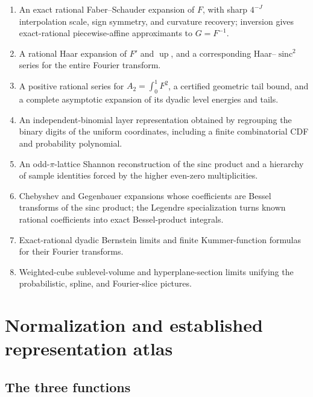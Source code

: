 \documentclass[11pt,oneside]{article}
\theoremstyle{definition}
\theoremstyle{remark}
\newcommand{\Up}{\operatorname{up}}
\newcommand{\sinc}{\operatorname{sinc}}
\newcommand{\1}{\mathbf 1}
\begin{document}
\begin{enumerate}
\item An exact rational Faber--Schauder expansion of $F$, with sharp
      $4^{-J}$ interpolation scale, sign symmetry, and curvature recovery;
      inversion gives exact-rational piecewise-affine approximants to $G=F^{-1}$.
\item A rational Haar expansion of $F'$ and $\Up$, and a corresponding
      Haar--$\sinc^2$ series for the entire Fourier transform.
\item A positive rational series for $A_2=\int_0^1F^2$, a certified geometric
      tail bound, and a complete asymptotic expansion of its dyadic level
      energies and tails.
\item An independent-binomial layer representation obtained by regrouping
      the binary digits of the uniform coordinates, including a finite
      combinatorial CDF and probability polynomial.
\item An odd-$\pi$-lattice Shannon reconstruction of the sinc product and a
      hierarchy of sample identities forced by the higher even-zero
      multiplicities.
\item Chebyshev and Gegenbauer expansions whose coefficients are
      Bessel transforms of the sinc product; the Legendre specialization
      turns known rational coefficients into exact Bessel-product integrals.
\item Exact-rational dyadic Bernstein limits and finite Kummer-function
      formulas for their Fourier transforms.
\item Weighted-cube sublevel-volume and hyperplane-section limits unifying
      the probabilistic, spline, and Fourier-slice pictures.
\end{enumerate}

\section{Normalization and established representation atlas}
\label{sec:atlas}

\subsection{The three functions}
\end{document}
